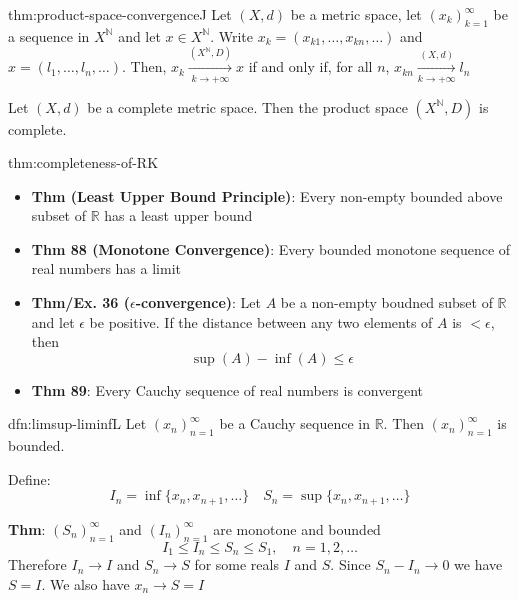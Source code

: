 \documentclass[landscape, 8pt]{extarticle}
\begin{document}
\begin{multicols}{3}
\begin{thm}{thm:product-space-convergence}{J}
    Let $(X, d)$ be a metric space, let $(x_{k})_{k=1}^{\infty}$ be a sequence in $X^{\mathbb{N}}$ and let $x\in X^{\mathbb{N}}$. Write $x_{k} = (x_{k 1},\dots, x_{kn},\dots)$ and $x = (l_{1},\dots,l_{n},\dots)$. Then, $x_{k} \xrightarrow[k \to +\infty]{(X^{\mathbb{N}}, D)} x$ if and only if, for all $n$, $x_{kn}\xrightarrow[k \to +\infty]{(X, d)} l_{n}$


    Let $(X, d)$ be a complete metric space. Then the product space $(X^{\mathbb{N}}, D)$ is complete.
\end{thm}

\vspace{-5pt}
\begin{thm}{thm:completeness-of-R}{K}
    \vspace{-5pt}
    \begin{itemize}[leftmargin=*]
        \item \textbf{Thm (Least Upper Bound Principle)}: Every non-empty bounded above subset of $\mathbb{R}$ has a least upper bound
        \item \textbf{Thm 88 (Monotone Convergence)}: Every bounded monotone sequence of real numbers has a limit
        \item \textbf{Thm/Ex. 36 ($\epsilon$-convergence)}: Let $A$ be a non-empty boudned subset of $\mathbb{R}$ and let $\epsilon$ be positive. If the distance between any two elements of $A$ is $< \epsilon$, then
        \[\sup(A) - \inf(A) \le \epsilon\]
        \vspace{-13pt}
        \item \textbf{Thm 89}: Every Cauchy sequence of real numbers is convergent
    \end{itemize}
\end{thm}

\begin{dfn}{dfn:limsup-liminf}{L}
    \vspace{-5pt}
    Let $(x_{n})^{\infty}_{n=1}$ be a Cauchy sequence in $\mathbb{R}$. Then $(x_{n})^{\infty}_{n=1}$ is bounded.

    Define:
    \[I_{n} = \inf \{x_{n}, x_{n+1},\dots\} \quad S_{n} = \sup \{x_{n}, x_{n+1},\dots\}\]

    \vspace{-5pt}
    \longrule{0.08ex}
    \textbf{Thm}: $(S_{n})^{\infty}_{n=1}$ and $(I_{n})^{\infty}_{n=1}$ are monotone and bounded
    \[I_{1} \le I_{n} \le S_{n} \le S_{1}, \quad n = 1,2,\dots\]
    Therefore $I_{n} \to I$ and $S_{n} \to S$ for some reals $I$ and $S$. Since $S_{n} - I_{n} \to 0$ we have $S = I$. We also have $x_{n}\to S = I$


\end{dfn}
\end{multicols}
\end{document}
